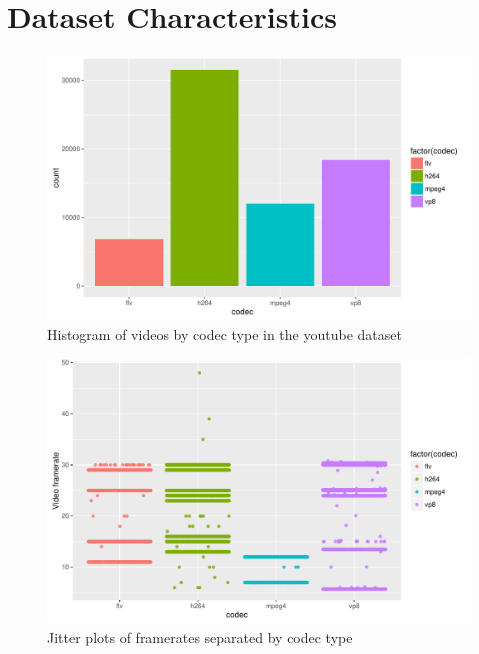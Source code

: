 \documentclass[letterpaper,12pt,titlepage,oneside,final]{report}
\begin{document}
    \section{Dataset Characteristics}
        \begin{figure}[!h]
            \centering
            \includegraphics[width=\textwidth]{codec_hist}
            \caption{Histogram of videos by codec type in the youtube dataset}
            \label{codec_hist}
        \end{figure}
        \begin{figure}[!h]
            \centering
            \includegraphics[width=\textwidth]{framerate_hist}
            \caption{Jitter plots of framerates separated by codec type}
            \label{framerate_hist}
        \end{figure}
\end{document}
